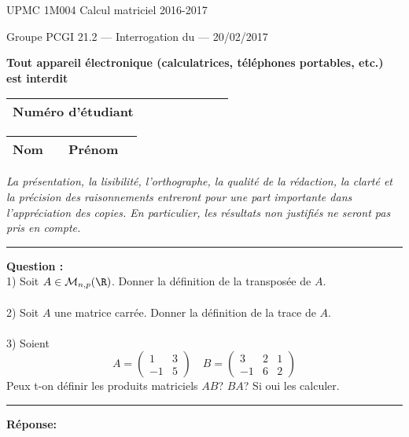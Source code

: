 \documentclass[11pt]{article}
\begin{document}
{\large UPMC \hfill 1M004 Calcul matriciel \hfill 2016-2017}

\vskip -3mm
\noindent \textbf{\hrulefill}

\vskip 1mm

\centerline{
{\large Groupe PCGI 21.2 \hspace{1.7 cm} --- Interrogation du --- \hspace{3.5 cm}  20/02/2017}}


\vskip -2mm
\noindent \textbf{\hrulefill}



\vskip 2mm

\centerline{\textbf{Tout appareil \'electronique (calculatrices, t\'el\'ephones portables, etc.) est interdit}}

\vskip 2mm
{\LARGE
\begin{center}
\begin{tabular}{|p{7cm}|p{1cm}|p{1cm}|p{1cm}|p{1cm}|p{1cm}|p{1cm}|p{1cm}|}
\hline
\textbf{Num\'ero d'\'etudiant} &     & & & & &   &
\\
\hline
\end{tabular}

\vskip 0.25cm

\begin{tabular}{|p{2cm}|p{6cm}|p{3cm}|p{5cm}|}
\hline
\textbf{Nom} &     & \textbf{Pr\'enom   }  &   \\
\hline
\end{tabular}
\end{center}
} %


{\sl  La pr\'esentation, la lisibilit\'e, l'orthographe, la
 qualit\'e de la r\'edaction, la clart\'e et la pr\'ecision des
 raisonnements entreront pour une part importante dans
 l'appr\'eciation des copies. En particulier, les r\'esultats non
 justifi\'es ne seront pas pris en compte. }


\vskip 3mm
\hrule

\vskip 3mm
\noindent \textbf{Question :}\\
1) Soit $A \in \mathcal{M}_{n,p}(\R)$. Donner la définition de la transposée de $A$.\\\\
2) Soit $A$ une matrice carrée. Donner la définition de la trace de $A$.\\\\
3) Soient
\begin{equation}
A=
\begin{pmatrix}
1 & 3\\-1 & 5
\end{pmatrix}
\quad B = 
\begin{pmatrix}
3 & 2 & 1\\
-1 & 6 & 2
\end{pmatrix}
\end{equation}
Peux t-on définir les produits matriciels $AB$? $BA$? Si oui les calculer.



\kern\medskipamount

\hrule

\vskip 3mm


\noindent \textbf{Réponse:}\\

\newpage
\end{document}
